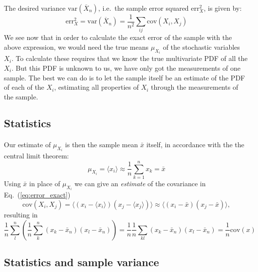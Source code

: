 \documentclass[%
oneside,                 %
final,                   %
10pt]{article}
\begin{document}
\paragraph{}
The desired variance
$\mathrm{var}(\overline X_n)$, i.e.~the sample error squared
$\mathrm{err}_X^2$, is given by:
\begin{equation}
\mathrm{err}_X^2 = \mathrm{var}(\overline X_n) = \frac{1}{n^2}
\sum_{ij} \mathrm{cov}(X_i, X_j)
\label{eq:error_exact}
\end{equation}
We see now that in order to calculate the exact error of the sample
with the above expression, we would need the true means
$\mu_{X_i}^{\phantom X}$ of the stochastic variables $X_i$. To
calculate these requires that we know the true multivariate PDF of all
the $X_i$. But this PDF is unknown to us, we have only got the measurements of
one sample. The best we can do is to let the sample itself be an
estimate of the PDF of each of the $X_i$, estimating all properties of
$X_i$ through the measurements of the sample.



\subsection*{Statistics}

\paragraph{}
Our estimate of $\mu_{X_i}^{\phantom X}$ is then the sample mean $\bar x$
itself, in accordance with the the central limit theorem:
\[
\mu_{X_i}^{\phantom X} = \langle x_i\rangle \approx \frac{1}{n}\sum_{k=1}^n x_k = \bar x
\]
Using $\bar x$ in place of $\mu_{X_i}^{\phantom X}$ we can give an
\emph{estimate} of the covariance in Eq.~(\ref{eq:error_exact})
\[
\mathrm{cov}(X_i, X_j) = \langle (x_i-\langle x_i\rangle)(x_j-\langle x_j\rangle)\rangle
\approx\langle (x_i - \bar x)(x_j - \bar{x})\rangle,
\]
resulting in
\[ 
\frac{1}{n} \sum_{l}^n \left(\frac{1}{n}\sum_{k}^n (x_k -\bar x_n)(x_l - \bar x_n)\right)=\frac{1}{n}\frac{1}{n} \sum_{kl} (x_k -\bar x_n)(x_l - \bar x_n)=\frac{1}{n}\mathrm{cov}(x)
\]



\subsection*{Statistics and sample variance}
\end{document}
